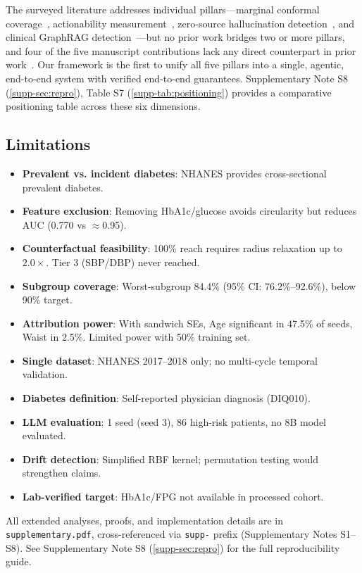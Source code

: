 \documentclass[11pt,a4paper]{article}
\theoremstyle{plain}
\begin{document}
The surveyed literature addresses individual pillars---marginal conformal coverage~\cite{datta2025conformal, liu2026speedcp}, actionability measurement~\cite{kelechi2023mga}, zero-source hallucination detection~\cite{yang2026hcpd}, and clinical GraphRAG detection~\cite{ye2026curaview}---but no prior work bridges two or more pillars, and four of the five manuscript contributions lack any direct counterpart in prior work~\cite{datta2025conformal, liu2026speedcp, oh2026cbfi, kelechi2023mga, yang2026hcpd, ye2026curaview}. Our framework is the first to unify all five pillars into a single, agentic, end-to-end system with verified end-to-end guarantees. Supplementary Note S8 (\ref{supp-sec:repro}), Table S7 (\ref{supp-tab:positioning}) provides a comparative positioning table across these six dimensions.

\subsection{Limitations}
\label{sec:limitations_full}
\begin{itemize}
\item \textbf{Prevalent vs. incident diabetes}: NHANES provides cross-sectional prevalent diabetes.
\item \textbf{Feature exclusion}: Removing HbA1c/glucose avoids circularity but reduces AUC (0.770 vs $\approx$0.95).
\item \textbf{Counterfactual feasibility}: 100\% reach requires radius relaxation up to $2.0\times$. Tier 3 (SBP/DBP) never reached.
\item \textbf{Subgroup coverage}: Worst-subgroup 84.4\% (95\% CI: 76.2\%--92.6\%), below 90\% target.
\item \textbf{Attribution power}: With sandwich SEs, Age significant in 47.5\% of seeds, Waist in 2.5\%. Limited power with 50\% training set.
\item \textbf{Single dataset}: NHANES 2017--2018 only; no multi-cycle temporal validation.
\item \textbf{Diabetes definition}: Self-reported physician diagnosis (DIQ010).
\item \textbf{LLM evaluation}: 1 seed (seed 3), 86 high-risk patients, no 8B model evaluated.
\item \textbf{Drift detection}: Simplified RBF kernel; permutation testing would strengthen claims.
\item \textbf{Lab-verified target}: HbA1c/FPG not available in processed cohort.
\end{itemize}
All extended analyses, proofs, and implementation details are in \texttt{supplementary.pdf}, cross-referenced via \texttt{supp-} prefix (Supplementary Notes S1--S8). See Supplementary Note S8 (\ref{supp-sec:repro}) for the full reproducibility guide.
\end{document}
